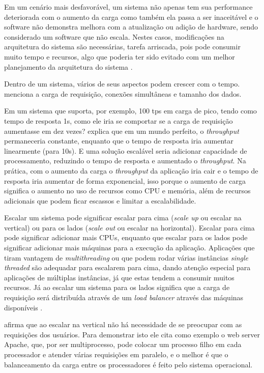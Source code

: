 \documentclass[diss]{template/setrem}
\begin{document}
Em um cenário mais desfavorável, um sistema não apenas tem sua performance deteriorada com o aumento da carga como também ela passa a ser inaceitável e o software não demonstra melhora com a atualização ou adição de hardware, sendo considerado um software que não escala. Nestes casos, modificações na arquitetura do sistema são necessárias, tarefa arriscada, pois pode consumir muito tempo e recursos, algo que poderia ter sido evitado com um melhor planejamento da arquitetura do sistema \citep{Liu2009}.

Dentro de um sistema, vários de seus aspectos podem crescer com o tempo. \citet{Gorton2011} menciona a carga de requisição, conexões simultâneas e tamanho dos dados.

Em um sistema que suporta, por exemplo, 100 tps em carga de pico, tendo como tempo de resposta 1s, como ele iria se comportar se a carga de requisição aumentasse em dez vezes? \citet{Gorton2011} explica que em um mundo perfeito, o \emph{throughput} permaneceria constante, enquanto que o tempo de resposta iria aumentar linearmente (para 10s). E uma solução escalável seria adicionar capacidade de processamento, reduzindo o tempo de resposta e aumentado o \emph{throughput}. Na prática, com o aumento da carga o \emph{throughput} da aplicação iria cair e o tempo de resposta iria aumentar de forma exponencial, isso porque o aumento de carga significa o aumento no uso de recursos como CPU e memória, além de recursos adicionais que podem ficar escassos e limitar a escalabilidade.

Escalar um sistema pode significar escalar para cima (\emph{scale up} ou escalar na vertical) ou para os lados (\emph{scale out} ou escalar na horizontal). Escalar para cima pode significar adicionar mais CPUs, enquanto que escalar para os lados pode significar adicionar mais máquinas para a execução da aplicação. Aplicações que tiram vantagem de \emph{multithreading} ou que podem rodar várias instâncias \emph{single threaded} são adequadar para escalarem para cima, dando atenção especial para aplicações de múltiplas instâncias, já que estas tendem a consumir muitos recursos. Já ao escalar um sistema para os lados significa que a carga de requisição será distribuída através de um \emph{load balancer} através das máquinas disponíveis \citep{Gorton2011}.

\citet{Henderson2006} afirma que ao escalar na vertical não há necessidade de se preocupar com as requisições dos usuários. Para demonstrar isto ele cita como exemplo o web server Apache, que, por ser multiprocesso, pode colocar um processo filho em cada processador e atender várias requisições em paralelo, e o melhor é que o balanceamento da carga entre os processadores é feito pelo sistema operacional.
\end{document}
